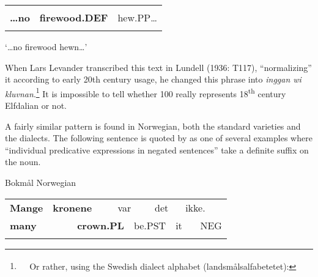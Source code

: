 \begin{tabular}{lll}
\lsptoprule
\multicolumn{3}{l}{{\bfseries …ingan}

}\\
{\bfseries …no} & {\bfseries firewood.DEF} & hew.PP…\\
\lspbottomrule
\end{tabular}

\begin{styleTranslation}
‘…no firewood hewn…’

\end{styleTranslation}

\begin{styleBodytextC}
When Lars Levander transcribed this text in Lundell (1936: T117), “normalizing” it according to early 20th century usage, he changed this phrase into \textit{inggan wi kluvnan}.\footnote{\textsuperscript{\ \ } Or rather, using the Swedish dialect alphabet (landsmålsalfabetetet):  } It is impossible to tell whether 100 really represents 18\textsuperscript{th} century Elfdalian or not. 

\end{styleBodytextC}

\begin{styleBodytextC}
A fairly similar pattern is found in Norwegian, both the standard varieties and the dialects. The following sentence is quoted by \citet[302]{FaarlundEtAl1997} as one of several examples where “individual predicative expressions in negated sentences” take a definite suffix on the noun. 

\end{styleBodytextC}

\begin{listWWNumileveli}
\item {}

\begin{styleExample}
Bokmål Norwegian 

\end{styleExample}

\end{listWWNumileveli}

\begin{tabular}{llllllllll}
\lsptoprule
{\bfseries Mange} & \multicolumn{2}{l}{{\bfseries kronene}

} & \multicolumn{2}{l}{var

} & \multicolumn{2}{l}{det

} & \multicolumn{2}{l}{ikke.

} & \\
\multicolumn{2}{l}{{\bfseries many}

} & \multicolumn{2}{l}{{\bfseries crown.PL}

} & \multicolumn{2}{l}{be.PST

} & \multicolumn{2}{l}{it

} & \multicolumn{2}{l}{NEG

}\\
\lspbottomrule
\end{tabular}

